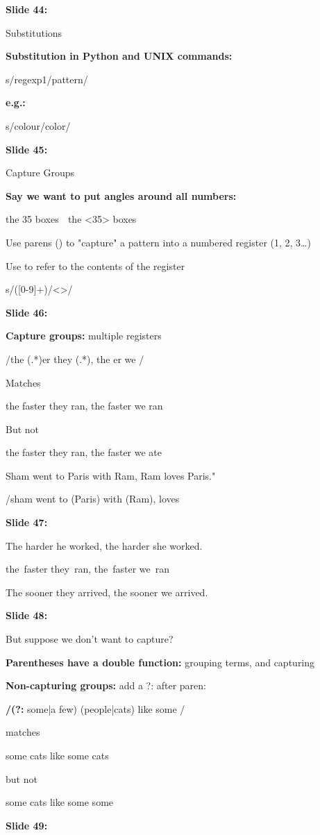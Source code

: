 \documentclass[11pt,a4paper]{article}
\begin{document}
\textbf{Slide 44:}

Substitutions

\textbf{Substitution in Python and UNIX commands:} 

s/regexp1/pattern/

\textbf{e.g.:} 

s/colour/color/

\textbf{Slide 45:}

Capture Groups

\textbf{Say we want to put angles around all numbers:} 

the 35 boxes  the <35> boxes

Use parens () to "capture" a pattern into a numbered register (1, 2, 3…)

Use \1  to refer to the contents of the register

s/([0-9]+)/<\1>/

\textbf{Slide 46:}

\textbf{Capture groups:}  multiple registers

/the (.*)er they (.*), the \1er we \2/

Matches

the faster they ran, the faster we ran

But not

the faster they ran, the faster we ate

Sham went to Paris with Ram, Ram loves Paris."

/sham went to (Paris) with (Ram),\1 loves \2

\textbf{Slide 47:}

The harder he worked, the harder she worked.

the faster they ran, the faster we ran

The sooner they arrived, the sooner we arrived.

\textbf{Slide 48:}

But suppose we don't want to capture?

\textbf{Parentheses have a double function:}  grouping terms, and capturing

\textbf{Non-capturing groups:}  add a ?: after paren:

\textbf{/(?:} some|a few) (people|cats) like some \1/

matches

some cats like some cats

but not

some cats like some some

\textbf{Slide 49:}
\end{document}
